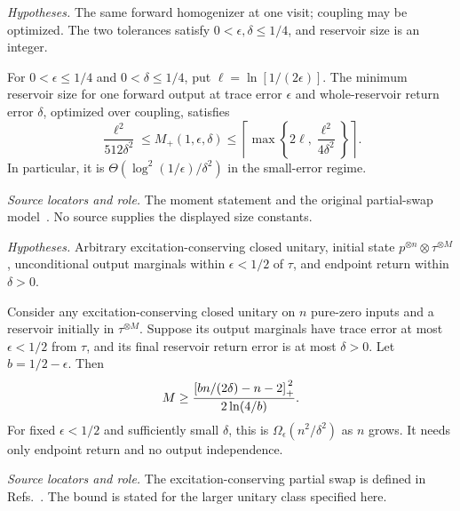 \documentclass[11pt]{article}
\begin{document}
\par\medskip
\noindent\begin{minipage}{\linewidth}
\emph{Hypotheses.} The same forward homogenizer at one visit; coupling may be optimized. The two tolerances satisfy $0<\epsilon,\delta\le1/4$, and reservoir size is an integer.

\begin{corollary}
For $0<\epsilon\le1/4$ and $0<\delta\le1/4$, put $\ell=\ln[1/(2\epsilon)]$. The minimum reservoir size for one forward output at trace error $\epsilon$ and whole-reservoir return error $\delta$, optimized over coupling, satisfies
\begin{equation}
 \frac{\ell^2}{512\delta^2}
 \le M_+(1,\epsilon,\delta)
 \le \left\lceil\max\left\{2\ell,\frac{\ell^2}{4\delta^2}\right\}\right\rceil.
\end{equation}
In particular, it is $\Theta(\log^2(1/\epsilon)/\delta^2)$ in the small-error regime.
\end{corollary}

\noindent\emph{Source locators and role.} The moment statement and the original partial-swap model~\cite{ziman}. No source supplies the displayed size constants.
\end{minipage}
\par

\par\medskip
\noindent\begin{minipage}{\linewidth}
\emph{Hypotheses.} Arbitrary excitation-conserving closed unitary, initial state $p^{\otimes n}\otimes\tau^{\otimes M}$, unconditional output marginals within $\epsilon<1/2$ of $\tau$, and endpoint return within $\delta>0$.

\begin{theorem}
Consider any excitation-conserving closed unitary on $n$ pure-zero inputs and a reservoir initially in $\tau^{\otimes M}$. Suppose its output marginals have trace error at most $\epsilon<1/2$ from $\tau$, and its final reservoir return error is at most $\delta>0$. Let $b=1/2-\epsilon$. Then
\begin{equation}
 M\ge
 \frac{\left[bn/(2\delta)-n-2\right]_+^{\,2}}{2\ln(4/b)}.
\end{equation}
For fixed $\epsilon<1/2$ and sufficiently small $\delta$, this is $\Omega_\epsilon(n^2/\delta^2)$ as $n$ grows. It needs only endpoint return and no output independence.
\end{theorem}

\noindent\emph{Source locators and role.} The excitation-conserving partial swap is defined in Refs.~\cite{ziman,scarani}. The bound is stated for the larger unitary class specified here.
\end{minipage}
\par
\end{document}
